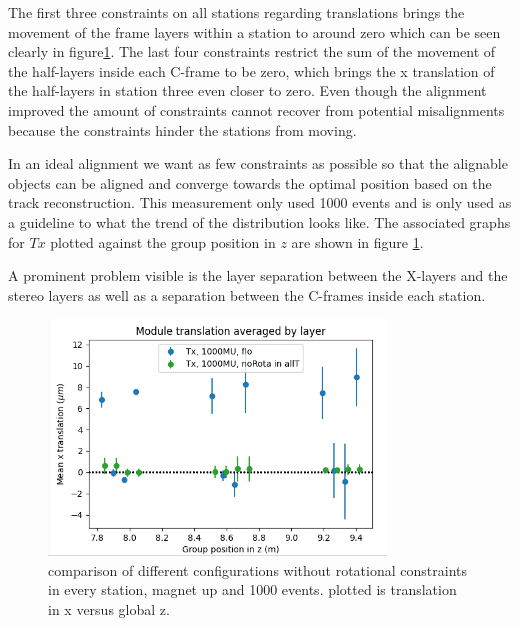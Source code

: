 The first three constraints on all stations regarding translations brings the movement of the frame layers within a station to around zero which can be seen clearly in figure\ref{fig:june_2}. The last four constraints restrict the sum of the movement of the half-layers inside each C-frame to be zero, which brings the x translation of the half-layers in station three even closer to zero.
Even though the alignment improved the amount of constraints cannot recover from potential misalignments because the constraints hinder the stations from moving.

In an ideal alignment we want as few constraints as possible so that the alignable objects can be aligned and converge towards the optimal position based on the track reconstruction.
This measurement only used 1000 events and is only used as a guideline to what the trend of the distribution looks like. The associated graphs for $Tx$ plotted against the group position in $z$ are shown in figure \ref{fig:june_2}.

A prominent problem visible is the layer separation between the X-layers and the stereo layers as well as a separation between the C-frames inside each station.

\begin{figure}
  \centering
  \includegraphics[width=0.8\textwidth]{plots/june_21/Tx_noRota_allT_1000MU.png}
  \caption{comparison of different configurations without rotational constraints in every station, magnet up and 1000 events. plotted is translation in x versus global z.}
  \label{fig:june_2}
\end{figure}

